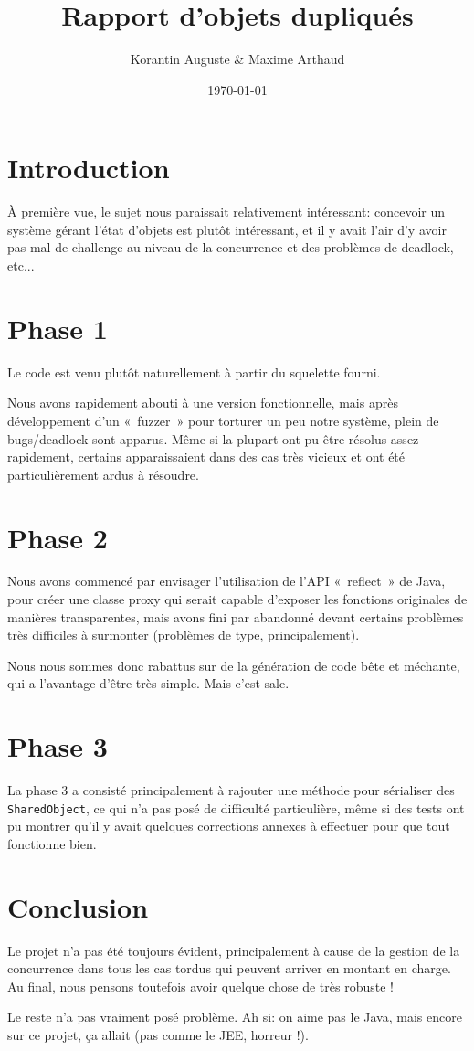 \documentclass[11pt,a4paper]{article}
\title{Rapport d'objets dupliqués}
\author{Korantin Auguste \& Maxime Arthaud}
\date{\today}
\begin{document}
\maketitle

\section{Introduction}

À première vue, le sujet nous paraissait relativement intéressant: concevoir un système gérant l'état d'objets est plutôt intéressant,
et il y avait l'air d'y avoir pas mal de challenge au niveau de la concurrence et des problèmes de deadlock, etc...

\section{Phase 1}

Le code est venu plutôt naturellement à partir du squelette fourni.

Nous avons rapidement abouti à une version fonctionnelle, mais après développement d'un «~fuzzer~» pour torturer un peu notre système,
plein de bugs/deadlock sont apparus.
Même si la plupart ont pu être résolus assez rapidement, certains apparaissaient dans des
cas très vicieux et ont été particulièrement ardus à résoudre.

\section{Phase 2}

Nous avons commencé par envisager l'utilisation de l'API «~reflect~» de Java, pour créer une classe proxy qui serait capable d'exposer
les fonctions originales de manières transparentes, mais avons fini par abandonné devant certains problèmes très difficiles à surmonter
(problèmes de type, principalement).

Nous nous sommes donc rabattus sur de la génération de code bête et méchante, qui a l'avantage d'être très simple. Mais c'est sale.

\section{Phase 3}

La phase 3 a consisté principalement à rajouter une méthode pour sérialiser des \verb+SharedObject+, ce qui n'a pas posé de difficulté
particulière, même si des tests ont pu montrer qu'il y avait quelques corrections annexes à effectuer pour que tout fonctionne bien.

\section{Conclusion}

Le projet n'a pas été toujours évident, principalement à cause de la gestion de la concurrence dans tous les cas tordus
qui peuvent arriver en montant en charge. Au final, nous pensons toutefois avoir quelque chose de très robuste !

Le reste n'a pas vraiment posé problème. Ah si: on aime pas le Java, mais encore sur ce projet, ça allait (pas comme le JEE, horreur !).
\end{document}
